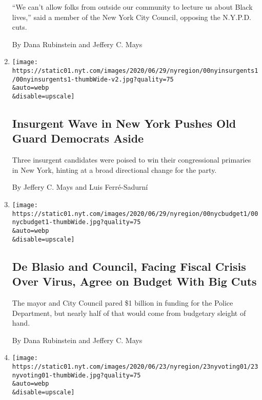 \begin{enumerate}
  ``We can't allow folks from outside our community to lecture us about
  Black lives,'' said a member of the New York City Council, opposing
  the N.Y.P.D. cuts.

  By Dana Rubinstein and Jeffery C. Mays
\item
  \href{/2020/06/30/nyregion/ny-house-primaries.html}{}

  \texttt{[image: https://static01.nyt.com/images/2020/06/29/nyregion/00nyinsurgents1/00nyinsurgents1-thumbWide-v2.jpg?quality=75\\\&auto=webp\\\&disable=upscale]}

  \hypertarget{insurgent-wave-in-new-york-pushes-old-guard-democrats-aside}{%
  \subsection{Insurgent Wave in New York Pushes Old Guard Democrats
  Aside}\label{insurgent-wave-in-new-york-pushes-old-guard-democrats-aside}}

  Three insurgent candidates were poised to win their congressional
  primaries in New York, hinting at a broad directional change for the
  party.

  By Jeffery C. Mays and Luis Ferré-Sadurní
\item
  \href{/2020/06/29/nyregion/nyc-budget-police.html}{}

  \texttt{[image: https://static01.nyt.com/images/2020/06/29/nyregion/00nycbudget1/00nycbudget1-thumbWide.jpg?quality=75\\\&auto=webp\\\&disable=upscale]}

  \hypertarget{de-blasio-and-council-facing-fiscal-crisis-over-virus-agree-on-budget-with-big-cuts}{%
  \subsection{De Blasio and Council, Facing Fiscal Crisis Over Virus,
  Agree on Budget With Big
  Cuts}\label{de-blasio-and-council-facing-fiscal-crisis-over-virus-agree-on-budget-with-big-cuts}}

  The mayor and City Council pared \$1 billion in funding for the Police
  Department, but nearly half of that would come from budgetary sleight
  of hand.

  By Dana Rubinstein and Jeffery C. Mays
\item
  \href{/2020/06/23/nyregion/voting-nyc-primary.html}{}

  \texttt{[image: https://static01.nyt.com/images/2020/06/23/nyregion/23nyvoting01/23nyvoting01-thumbWide.jpg?quality=75\\\&auto=webp\\\&disable=upscale]}


\end{enumerate}
